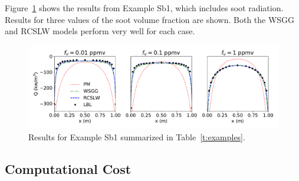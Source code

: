 \documentclass[preprint,12pt]{elsarticle}
\begin{document}
Figure~\ref{f:exSb1} shows the results from Example Sb1, which includes soot radiation. Results for three values of the soot volume fraction are shown. Both the WSGG and RCSLW models perform very well for each case. 
%
\begin{figure}
    \begin{center}
        \includegraphics[width=5.5 in]{fig_ex_Sb1.pdf}
    \caption{Results for Example Sb1 summarized in Table~\ref{t:examples}.}
    \label{f:exSb1}
    \end{center}
\end{figure}
%


\subsection{Computational Cost} \label{s:cost}
\end{document}
